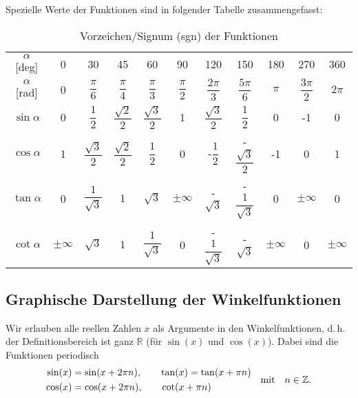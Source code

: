 Spezielle Werte der Funktionen sind in folgender Tabelle zusammengefasst: 
\begin{table}[htp]
    \centering
    \caption{Vorzeichen/Signum (sgn) der Funktionen}
    \begin{tabular}{c c c c c c c c c c c }
        \toprule 
         $\alpha$ [deg] & 0 & 30 & 45 & 60 & 90 & 120 & 150 & 180 & 270 & 360 \\
         $\alpha$ [rad] & 0 & $\dfrac{\pi}{6}$ & $\dfrac{\pi}{4}$ & $\dfrac{\pi}{3}$ & $\dfrac{\pi}{2}$ & $\dfrac{2\pi}{3}$ & $\dfrac{5\pi}{6}$ & $\pi$ & $\dfrac{3\pi}{2}$ & $2\pi$\\[.4em]
         \midrule 
         $\sin\alpha$   & 0 & $\dfrac{1}{2}$ & $\dfrac{\sqrt{2}}{2}$ & $\dfrac{\sqrt{3}}{2}$ & 1 & $\dfrac{\sqrt{3}}{2}$ & $\dfrac{1}{2}$ & 0 & -1 & 0 \\[.7em]
         $\cos\alpha$   & 1 & $\dfrac{\sqrt{3}}{2}$ & $\dfrac{\sqrt{2}}{2}$ & $\dfrac{1}{2}$ & 0 & -$\dfrac{1}{2}$ & -$\dfrac{\sqrt{3}}{2}$ & -1 & 0 & 1 \\[.7em]
         $\tan\alpha$   & 0 & $\dfrac{1}{\sqrt{3}}$ & $1$ & $\sqrt{3}$ & $\pm \infty$ & -$\sqrt{3}$ & -$\dfrac{1}{\sqrt{3}}$ & 0 & $\pm \infty$ & 0 \\[.7em]
         $\cot\alpha$   & $\pm\infty$ & $\sqrt{3}$ & $1$ & $\dfrac{1}{\sqrt{3}}$ & 0 & -$\dfrac{1}{\sqrt{3}}$ & -$\sqrt{3}$ & $\pm \infty$ & 0 & $\pm \infty$ \\

    \end{tabular}
    \vspace{-1cm}
\end{table}

\subsection{Graphische Darstellung der Winkelfunktionen}

Wir erlauben alle reellen Zahlen $x$ als Argumente in den Winkelfunktionen, d.\,h. der Definitionsbereich ist ganz $\mathbb{R}$ (für $\sin(x)$ und $\cos(x)$). Dabei sind die Funktionen periodisch 
\begin{align}
    \begin{split}
        \sin(x) &= \sin(x+2\pi n), \qquad \tan(x) = \tan(x+\pi n) \\
        \cos(x) &= \cos(x+2\pi n), \qquad \cot(x+\pi n)
    \end{split} \qq{mit} n \in \mathbb{Z}.
\end{align}

